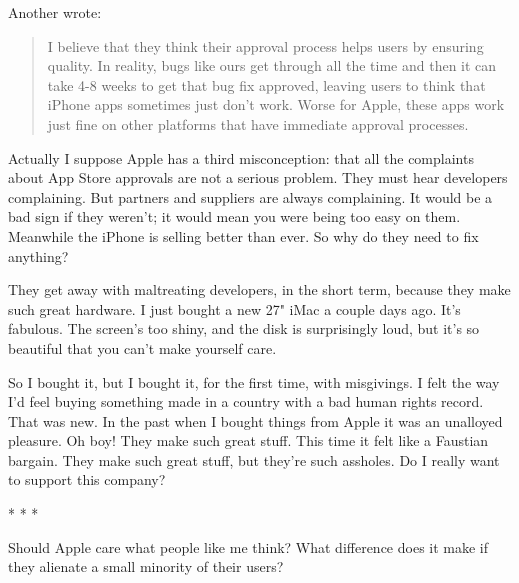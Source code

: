                   Another wrote:
                  \begin{quote}

                    I believe that they think their approval process helps users
                    by ensuring quality. In reality, bugs like ours get through
                    all the time and then it can take 4-8 weeks to get that bug
                    fix approved, leaving users to think that iPhone apps
                    sometimes just don't work. Worse for Apple, these apps work
                    just fine on other platforms that have immediate approval
                    processes.
                  
\end{quote}

                  Actually I suppose Apple has a third misconception: that all
                  the complaints about App Store approvals are not a serious
                  problem. They must hear developers complaining. But partners
                  and suppliers are always complaining. It would be a bad sign
                  if they weren't; it would mean you were being too easy on
                  them. Meanwhile the iPhone is selling better than ever. So why
                  do they need to fix anything?

They get away with
                  maltreating developers, in the short term, because they make
                  such great hardware. I just bought a new 27" iMac a couple
                  days ago. It's fabulous. The screen's too shiny, and the disk
                  is surprisingly loud, but it's so beautiful that you can't
                  make yourself care.

So I bought it, but I bought
                  it, for the first time, with misgivings. I felt the way I'd
                  feel buying something made in a country with a bad human
                  rights record. That was new. In the past when I bought things
                  from Apple it was an unalloyed pleasure. Oh boy! They make
                  such great stuff. This time it felt like a Faustian bargain.
                  They make such great stuff, but they're such assholes. Do I
                  really want to support this company?


                  * * *
                  

Should Apple care what people like me think? What
                  difference does it make if they alienate a small minority of
                  their users?

